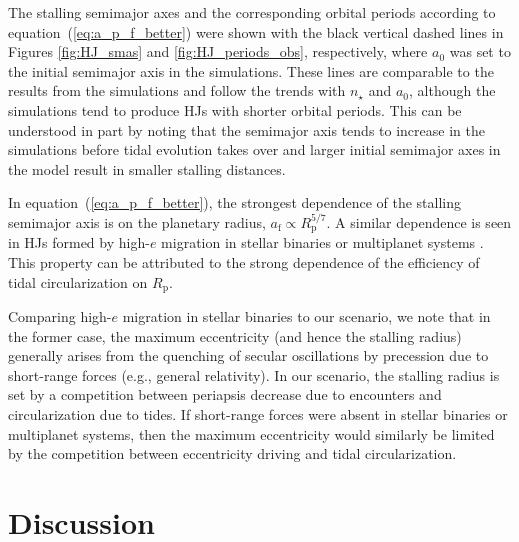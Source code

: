 \documentclass[iop,usenatbib]{emulateapj}
\begin{document}
The stalling semimajor axes and the corresponding orbital periods according to equation~(\ref{eq:a_p_f_better}) were shown with the black vertical dashed lines in Figures \ref{fig:HJ_smas} and \ref{fig:HJ_periods_obs}, respectively, where $a_0$ was set to the initial semimajor axis in the simulations. These lines are comparable to the results from the simulations and follow the trends with $n_\star$ and $a_0$, although the simulations tend to produce HJs with shorter orbital periods. This can be understood in part by noting that  the semimajor axis tends to increase in the simulations before tidal evolution takes over and larger initial semimajor axes in the model result in smaller stalling distances. 

In equation~(\ref{eq:a_p_f_better}), the strongest dependence of the stalling semimajor axis is on the planetary radius, $a_{\mathrm{f}}\propto R_\mathrm{p}^{5/7}$. A similar dependence is seen in HJs formed by high-$e$ migration in stellar binaries or multiplanet systems \citep{2011ApJ...735..109W,2015ApJ...799...27P,2015ApJ...805...75P}. This property can be attributed to the strong dependence of the efficiency of tidal circularization on $R_\mathrm{p}$.

Comparing high-$e$ migration in stellar binaries to our scenario, we note that in the former case, the maximum eccentricity (and hence the stalling radius) generally arises from the quenching of secular oscillations by precession due to short-range forces (e.g., general relativity). In our scenario, the stalling radius is set by a competition between periapsis decrease due to encounters and circularization due to tides. If short-range forces were absent in stellar binaries or multiplanet systems, then the maximum eccentricity would similarly be limited by the competition between eccentricity driving and tidal circularization. 



\section{Discussion}
\label{sect:discussion}
\end{document}
